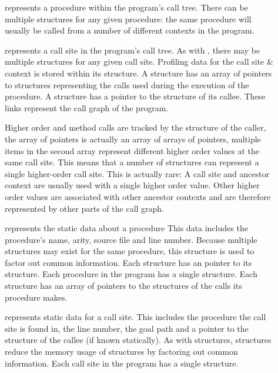 \begin{description}

    \item[\PD]
    represents a procedure within the program's call tree.
    There can be multiple \PD structures for any given procedure:
    the same procedure will usually be called from a number of different
    contexts in the program.

    \item[\CSD]
    represents a call site in the program's call tree.
    As with \PD, there may be multiple \CSD structures for any given
    call site.
    Profiling data for the call site \& context is stored within its \CSD
    structure.
    A \PD structure has an array of pointers to \CSD structures representing
    the calls used during the execution of the procedure.
    A \CSD structure has a pointer to the \PD structure of its callee.
    These links represent the call graph of the program.

    Higher order and method calls are tracked by the \PD structure of the
    caller,
    the array of pointers is actually an array of arrays of pointers,
    multiple items in the second array represent different higher order
    values at the same call site.
    This means that a number of \CSD structures can represent a single
    higher-order call site.
    This is actually rare:
    A call site and ancestor context are usually used with a single higher
    order value.
    Other higher order values are associated with other ancestor contexts
    and are therefore represented by other parts of the call graph.

    \item[\PS]
    represents the static data about a procedure
    This data includes the procedure's name, arity, source file and line
    number.
    Because multiple \PD structures may exist for the same procedure,
    this structure is used to factor out common information.
    Each \PD structure has an pointer to its \PS structure.
    Each procedure in the program has a single \PS structure.
    Each \PS structure has an array of pointers to the \CSS structures
    of the calls its procedure makes.

    \item[\CSS]
    represents static data for a call site.
    This includes the procedure the call site is found in, the line number,
    the goal path and a pointer to the \PS structure of the callee (if known
    statically).
    As with \PS structures,
    \CSS structures reduce the memory usage of \CSD structures by
    factoring out common information.
    Each call site in the program has a single \CSS structure.

\end{description}

